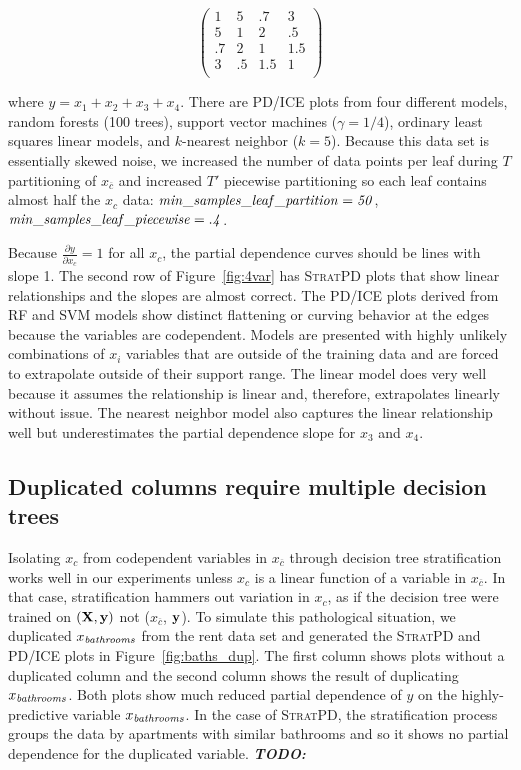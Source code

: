 \documentclass[12pt]{article}
\newcommand{\figref}[1]{Figure~\ref{#1}}
\newcommand{\todo}[1]{{\bf\em TODO:} {{\color{red}{#1}}}}
\newcommand{\spd}{\fontfamily{cmr}\textsc{\small StratPD}}
\newcommand{\xnc}{$x_{\overline{c}}$}
\begin{document}
\[
\left(
\begin{array}{cccc}
1 & 5 &.7 & 3\\
5 &1 &2 &.5\\
.7 &2 & 1 & 1.5\\
3 &.5 &1.5 &1\\
\end{array}
\right)
\]

\noindent where $y = x_1 + x_2 + x_3 + x_4$.  There are PD/ICE plots from four different models, random forests (100 trees), support vector machines ($\gamma=1/4$), ordinary least squares linear models, and $k$-nearest neighbor ($k=5$).  Because this data set is essentially skewed noise, we increased the number of data points per leaf during $T$ partitioning of \xnc{} and increased $T'$ piecewise partitioning so each leaf contains almost half the $x_c$ data: ${\it min\_samples\_leaf\_partition = 50}$, ${\it min\_samples\_leaf\_piecewise = .4}$.

Because $\frac{\partial y}{\partial x_{c}} = 1$ for all $x_c$, the partial dependence curves should be lines with slope 1.  The second row of \figref{fig:4var} has \spd{} plots that show linear relationships and the slopes are almost correct.  The PD/ICE plots derived from RF and SVM models show distinct flattening or curving behavior at the edges because the variables are codependent. Models are presented with highly unlikely combinations of $x_i$ variables that are outside of the training data and are forced to extrapolate outside of their support range.  The linear model does very well because it assumes the relationship is linear and, therefore, extrapolates linearly without issue. The nearest neighbor model also captures the linear relationship well but underestimates the partial dependence slope for $x_3$ and $x_4$.
 
\subsection{Duplicated columns require multiple decision trees}\label{sec:dup}

Isolating $x_c$ from codependent variables in \xnc{} through decision tree stratification works well in our experiments unless $x_c$ is a linear function of a variable in \xnc{}. In that case, stratification hammers out variation in $x_c$, as if the decision tree were trained on $(\bf X, y)$ not (\xnc, $\bf y$). To simulate this pathological situation, we duplicated $x_{\it bathrooms}$ from the rent data set and generated the \spd{} and PD/ICE plots in \figref{fig:baths_dup}. The first column shows plots without a duplicated column and the second column shows the result of duplicating $x_{\it bathrooms}$. Both plots show much reduced partial dependence of $y$ on the highly-predictive variable $x_{\it bathrooms}$. In the case of \spd{}, the stratification process groups the data by apartments with similar bathrooms and so it shows no partial dependence for the duplicated variable.  \todo{why are there many fewer lines in stratpd plot would do begin to column?}
\end{document}

